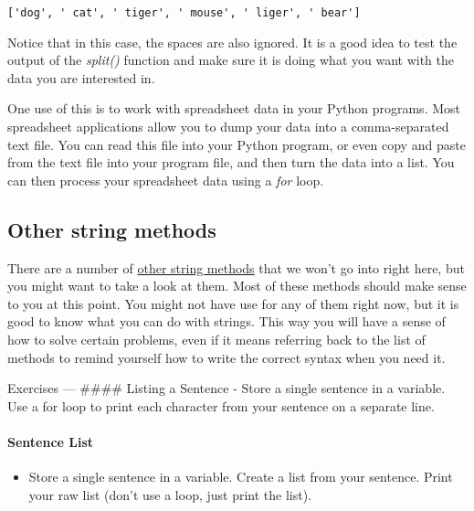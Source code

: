 \documentclass[11pt]{article}
\providecommand{\tightlist}{%
      \setlength{\itemsep}{0pt}\setlength{\parskip}{0pt}}
\begin{document}
    \begin{Verbatim}[commandchars=\\\{\}]
['dog', ' cat', ' tiger', ' mouse', ' liger', ' bear']
    \end{Verbatim}

    Notice that in this case, the spaces are also ignored. It is a good idea
to test the output of the \emph{split()} function and make sure it is
doing what you want with the data you are interested in.

One use of this is to work with spreadsheet data in your Python
programs. Most spreadsheet applications allow you to dump your data into
a comma-separated text file. You can read this file into your Python
program, or even copy and paste from the text file into your program
file, and then turn the data into a list. You can then process your
spreadsheet data using a \emph{for} loop.

    \hypertarget{other-string-methods}{%
\subsection{Other string methods}\label{other-string-methods}}

There are a number of
\href{http://docs.python.org/3.3/library/stdtypes.html\#string-methods}{other
string methods} that we won't go into right here, but you might want to
take a look at them. Most of these methods should make sense to you at
this point. You might not have use for any of them right now, but it is
good to know what you can do with strings. This way you will have a
sense of how to solve certain problems, even if it means referring back
to the list of methods to remind yourself how to write the correct
syntax when you need it.

    Exercises --- \#\#\#\# Listing a Sentence - Store a single sentence in a
variable. Use a for loop to print each character from your sentence on a
separate line.

\hypertarget{sentence-list}{%
\paragraph{Sentence List}\label{sentence-list}}

\begin{itemize}
\tightlist
\item
  Store a single sentence in a variable. Create a list from your
  sentence. Print your raw list (don't use a loop, just print the list).
\end{itemize}
\end{document}
